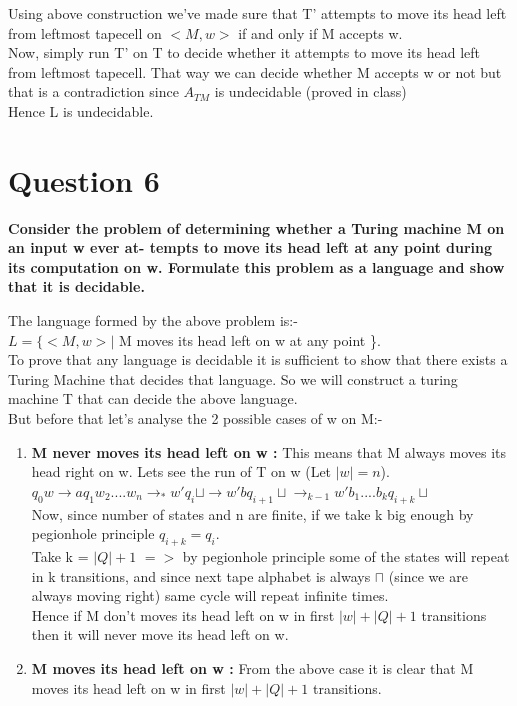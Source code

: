 \documentclass{article}
\begin{document}
Using above construction we've made sure that T' attempts to move its head left from leftmost tapecell on $<M,w>$ if and only if M accepts w.\\
Now, simply run T' on T to decide whether it attempts to move its head left from leftmost tapecell. That way we can decide whether M accepts w or not but that is 
a contradiction since $A_{TM}$ is undecidable (proved in class)\\
Hence L is undecidable.

\pagebreak


\section{Question 6}

\textbf{Consider the problem of determining whether a Turing machine M on an input w ever at-
tempts to move its head left at any point during its computation on w. Formulate this
problem as a language and show that it is decidable.\\}

The language formed by the above problem is:- \\
$L = \{ <M,w> |$ M moves its head left on w at any point \}.\\

To prove that any language is decidable it is sufficient to show that there exists a Turing Machine that 
decides that language. So we will construct a turing machine T that can decide the above language.\\
But before that let's analyse the 2 possible cases of w on M:-

\begin{enumerate}
    \item \textbf{M never moves its head left on w :}
    This means that M always moves its head right on w. Lets see the run of T on w (Let $|w| = n$).\\
    $q_0w \rightarrow aq_1w_2....w_n \rightarrow_* w'q_i \sqcup \rightarrow w' b q_{i+1} \sqcup \rightarrow_{k-1} w' b_1....b_k q_{i+k} \sqcup   $\\
    Now, since number of states and n are finite, if we take k big enough by pegionhole principle $q_{i+k} = q_i$.\\
    Take k = $|Q|+1$ $=>$ by pegionhole principle some of the states will repeat in k transitions, and since next tape alphabet 
    is always $\sqcap$ (since we are always moving right) same cycle will repeat infinite times.\\
    Hence if M don't moves its head left on w in first $|w| + |Q| + 1$ transitions then it will never move its head left on w.\\

    \item \textbf{M moves its head left on w :}
    From the above case it is clear that M moves its head left on w in first $|w| + |Q| + 1$ transitions.\\
    
\end{enumerate}
\end{document}
